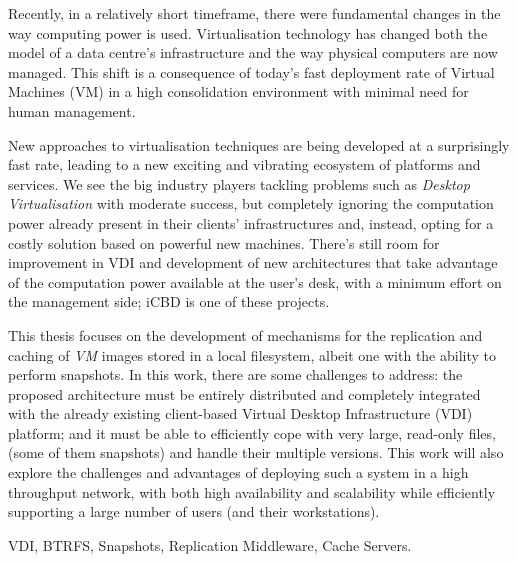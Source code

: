 
Recently, in a relatively short timeframe, there were fundamental changes in the way computing power is used. Virtualisation technology has changed both the model of a data centre’s infrastructure and the way physical computers are now managed. This shift is a consequence of today’s fast deployment rate of Virtual Machines (VM) in a high consolidation environment with minimal need for human management. 

New approaches to virtualisation techniques are being developed at a surprisingly fast rate, leading to a new exciting and vibrating ecosystem of platforms and services. We see the big industry players tackling problems such as \textit{Desktop Virtualisation} with moderate success, but completely ignoring the computation power already present in their clients’ infrastructures and, instead, opting for a costly solution based on powerful new machines. There’s still room for improvement in VDI and development of new architectures that take advantage of the computation power available at the user’s desk, with a minimum effort on the management side; iCBD is one of these projects. 

This thesis focuses on the development of mechanisms for the replication and caching of \textit{VM} images stored in a local filesystem, albeit one with the ability to perform snapshots. In this work, there are some challenges to address: the proposed architecture must be entirely distributed and completely integrated with the already existing client-based Virtual Desktop Infrastructure (VDI) platform; and it must be able to efficiently cope with very large, read-only files, (some of them snapshots) and handle their multiple versions. This work will also explore the challenges and advantages of deploying such a system in a high throughput network, with both high availability and scalability while efficiently supporting a large number of users (and their workstations).


\begin{keywords}
	VDI, BTRFS, Snapshots, Replication Middleware, Cache Servers.
\end{keywords} 

